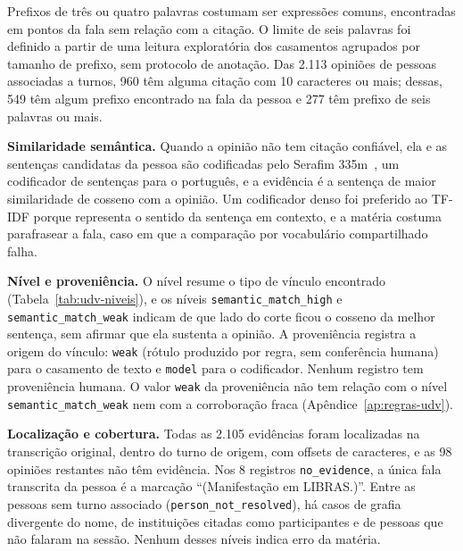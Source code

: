 Prefixos de três ou quatro palavras costumam ser expressões comuns, encontradas em pontos da fala sem
relação com a citação. O limite de seis palavras foi definido a partir de uma leitura exploratória
dos casamentos agrupados por tamanho de prefixo, sem protocolo de anotação. Das 2.113 opiniões de
pessoas associadas a turnos, 960 têm alguma citação com 10 caracteres ou mais; dessas, 549 têm algum
prefixo encontrado na fala da pessoa e 277 têm prefixo de seis palavras ou mais.

\textbf{Similaridade semântica.} Quando a opinião não tem citação confiável, ela e as sentenças
candidatas da pessoa são codificadas pelo Serafim 335m~\citep{gomes2024serafim}, um codificador de
sentenças para o português, e a evidência é a sentença de maior similaridade de cosseno com a
opinião. Um codificador denso foi preferido ao TF-IDF porque representa o sentido da sentença em
contexto, e a matéria costuma parafrasear a fala, caso em que a comparação por vocabulário
compartilhado falha.

\textbf{Nível e proveniência.} O nível resume o tipo de vínculo encontrado
(Tabela~\ref{tab:udv-niveis}), e os níveis \texttt{semantic\_match\_high} e
\texttt{semantic\_match\_weak} indicam de que lado do corte ficou o cosseno da melhor sentença, sem
afirmar que ela sustenta a opinião. A proveniência registra a origem do vínculo: \texttt{weak}
(rótulo produzido por regra, sem conferência humana) para o casamento de texto e \texttt{model} para
o codificador. Nenhum registro tem proveniência humana. O valor \texttt{weak} da proveniência não tem
relação com o nível \texttt{semantic\_match\_weak} nem com a corroboração fraca
(Apêndice~\ref{ap:regras-udv}).

\textbf{Localização e cobertura.} Todas as 2.105 evidências foram localizadas na transcrição
original, dentro do turno de origem, com offsets de caracteres, e as 98 opiniões restantes não têm
evidência. Nos 8 registros \texttt{no\_evidence}, a única fala transcrita da pessoa é a marcação
``(Manifestação em LIBRAS.)''. Entre as pessoas sem turno associado (\texttt{person\_not\_resolved}),
há casos de grafia divergente do nome, de instituições citadas como participantes e de pessoas que
não falaram na sessão. Nenhum desses níveis indica erro da matéria.




